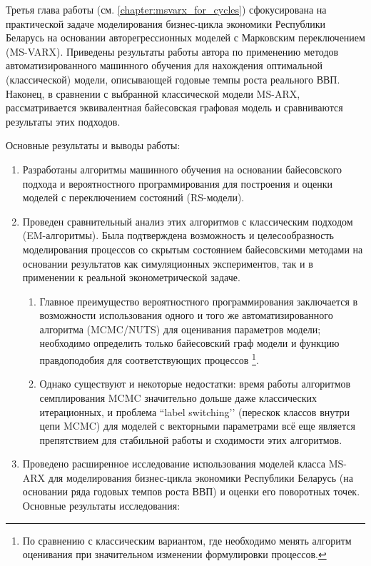 \documentclass[a4paper,14pt]{extreport}
\begin{document}
Третья глава работы (см. \ref{chapter:msvarx_for_cycles}) сфокусирована на практической задаче моделирования бизнес-цикла экономики Республики Беларусь на основании авторегрессионных моделей с Марковским переключением (MS-VARX). Приведены результаты работы автора по применению методов автоматизированного машинного обучения для нахождения оптимальной (классической) модели, описывающей годовые темпы роста реального ВВП. Наконец, в сравнении с выбранной классической модели MS-ARX, рассматривается эквивалентная байесовская графовая модель и сравниваются результаты этих подходов.

\clearpage

Основные результаты и выводы работы:

\begin{enumerate}
	\item Разработаны алгоритмы машинного обучения на основании байесовского подхода и вероятностного программирования для построения и оценки моделей с переключением состояний (RS-модели).
	\item Проведен сравнительный анализ этих алгоритмов с классическим подходом (EM-алгоритмы). Была подтверждена возможность и целесообразность моделирования процессов со скрытым состоянием байесовскими методами на основании результатов как симуляционных экспериментов, так и в применении к реальной эконометрической задаче.
	      \begin{enumerate}
		      \item Главное преимущество вероятностного программирования заключается в возможности использования одного и того же автоматизированного алгоритма (MCMC/NUTS) для оценивания параметров модели; необходимо определить только байесовский граф модели и функцию правдоподобия для соответствующих процессов \footnote{По сравнению с классическим вариантом, где необходимо менять алгоритм оценивания при значительном изменении формулировки процессов. }.
		      \item Однако существуют и некоторые недостатки: время работы алгоритмов семплирования MCMC значительно дольше даже классических итерационных, и проблема ``label switching’’ (перескок классов внутри цепи MCMC) для моделей с векторными параметрами всё еще является препятствием для стабильной работы и сходимости этих алгоритмов.
	      \end{enumerate}
	\item Проведено расширенное исследование использования моделей класса MS-ARX для моделирования бизнес-цикла экономики Республики Беларусь (на основании ряда годовых темпов роста ВВП) и оценки его поворотных точек. Основные результаты исследования:

\end{enumerate}
\end{document}
